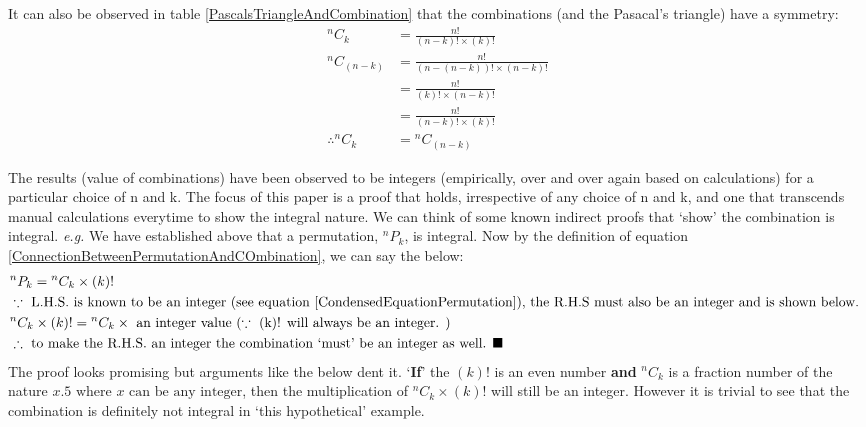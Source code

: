 \documentclass[10pt, twoside]{article}
\newcommand*{\Permutation}[2]{{}^{#1}P_{#2}}%
\newcommand*{\Combination}[2]{{}^{#1}C_{#2}}%
\begin{document}
	  It can also be observed in table \ref{PascalsTriangleAndCombination} that the combinations (and the Pasacal's triangle) have a symmetry:
	  \begin{align*}
	   	\Combination{n}{k} &= \frac{n!}{(n-k)!\times(k)!} \\
	   	\Combination{n}{(n-k)} &= \frac{n!}{(n-(n-k))!\times(n-k)!} \\
	   	&= \frac{n!}{{(k)!}\times(n-k)!} \\
	   	&= \frac{n!}{(n-k)!\times(k)!} \\
	   	\therefore \Combination{n}{k} &= \Combination{n}{(n-k)}  
	  \end{align*}
	  
	  
		The results (value of combinations) have been observed to be integers (empirically, over and over again based on calculations) for a particular choice of n and k. The focus of this paper is a proof that holds, irrespective of any choice of n and k, and one that transcends manual calculations everytime to show the integral nature. We can think of some known indirect proofs that `show' the combination is integral. \textit{e.g.} We have established above that a permutation, $\Permutation{n}{k}$, is integral. Now by the definition of equation \eqref{ConnectionBetweenPermutationAndCOmbination}, we can say the below:
	\begin{align*}
	   & \Permutation{n}{k} = \Combination{n}{k} \times (k)! \\
	   & \because \text{ L.H.S. is known to be an integer (see equation \eqref{CondensedEquationPermutation}), the R.H.S must also be an integer and is shown below. } \\
	   & \Combination{n}{k} \times (k)! = \Combination{n}{k} \times \text{ an integer value } (\because \text{ (k)! will always be an integer. }) \\
	   & \therefore \text{ to make the R.H.S. an integer the combination `must' be an integer as well. } \blacksquare 
	\end{align*}
	The proof looks promising but arguments like the below dent it. `\textbf{If}' the $(k)!$ is an even number \textbf{and} $\Combination{n}{k}$ is a fraction number of the nature $x.5 \text{ where $x$ can be any integer}$, then the multiplication of $\Combination{n}{k}\times (k)!$ will still be an integer. However it is trivial to see that the combination is definitely not integral in `this hypothetical' example.
	
\end{document}
